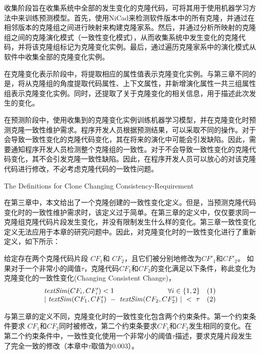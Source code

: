 收集阶段旨在收集系统中全部的发生变化的克隆代码，可将其用于使用机器学习方法中来训练预测模型。首先，使用NiCad来检测软件版本中的所有克隆，并通过在相邻版本的克隆组之间进行映射来构建克隆家系。然后，并通过分析所映射的克隆组之间的克隆演化模式（一致性变化模式），从而收集系统中发生变化的克隆代码，并将该克隆组标记为克隆变化实例。最后，通过遍历克隆家系中的演化模式从软件中收集全部的克隆变化实例。

在克隆变化表示阶段中，将提取相应的属性值表示克隆变化实例。与第三章不同的是，将从克隆组的角度提取代码属性、上下文属性，并新增演化属性一共三组属性组表示克隆变化实例。同时，还提取了关于克隆变化的相关信息，用于描述此次发生的变化。

在预测阶段中，使用收集到的克隆变化实例训练机器学习模型，并在克隆变化时预测克隆一致性维护需求。程序开发人员根据预测结果，可以采取不同的操作。对于会导致一致性变化的克隆代码变化，其在将来的演化中可能会引发缺陷。因此，需要通知程序开发人员检测整个克隆组的一致性。对于不会导致一致性变化的克隆代码变化，其不会引发克隆一致性缺陷。因此，在程序开发人员可以放心的对该克隆代码进行修改，不必考虑克隆代码的一致性问题。

{The Definitions for Clone Changing Consistency-Requirement}

在第三章中，本文给出了一个克隆创建的一致性变化定义。但是，当预测克隆代码变化时的一致性维护需求时，该定义过于简单。在第三章的定义中，仅仅要求同一克隆组克隆代码片段发生变化，并没有限制发生什么样的变化。第三章一致性变化定义无法应用于本章的研究问题中。因此，对克隆变化时的一致性变化进行了重新定义，如下所示：

\begin{definition}[克隆变化时一致性变化]  
\label{def-changingchange}
给定存在两个克隆代码片段 $CF_1$和 $CF_2$，且它们被分别地修改为$CF'_1$和$CF'_2$。  如果对于一个非常小的阈值$\tau$，克隆代码$CF_1$和$CF_2$的变化满足以下条件，称此变化为克隆变化的一致性变化(Changing Consistent Change)， 
  \[
  \begin{array}[t]{crl}
    \mathit{textSim}(CF_i, CF'_i) < 1 & \forall i \in \{1,2\} &(1) \\
    \multicolumn{2}{c}{| ~\mathit{textSim}(CF_1,CF'_1)  ~-~ \mathit{textSim}(CF_2,CF'_2) ~| ~< ~ \tau}  & (2)
  \end{array}
  \]
\end{definition}

与第三章的定义不同，克隆变化时的一致性变化包含两个约束条件。第一个约束条件要求 $CF_1 $和$CF_2 $同时被修改，第二个约束条要求$CF_1 $和$CF_2$发生相同的变化。在第二个约束条件中，一致性变化使用一个非常小的阈值$\tau$描述，要求克隆片段发生了完全一致的修改（本章中$\tau$取值为$0.003$）。


